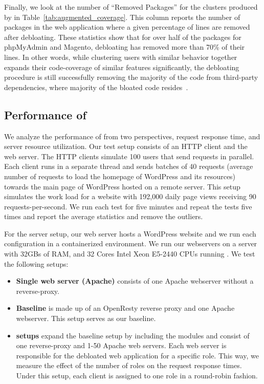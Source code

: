 Finally, we look at the number of ``Removed Packages'' for the clusters produced by \sys{} in Table~\ref{tab:augmented_coverage}. 
This column reports the number of packages in the web application where a given percentage of lines are removed after debloating.
These statistics show that for over half of the packages for phpMyAdmin and Magento, debloating has removed more than 70\% of their lines. 
In other words, while clustering users with similar behavior together expands their code-coverage of similar features significantly, the debloating procedure is still successfully removing the majority of the code from third-party dependencies, where majority of the bloated code resides~\cite{lessismore}.

\subsection{Performance of \sys}

We analyze the performance of \sys{} from two perspectives, request response time, and server resource utilization. 
Our test setup consists of an HTTP client and the web server. 
The HTTP clients simulate 100 users that send requests in parallel. 
Each client runs in a separate thread and sends batches of 40 requests (average number of requests to load the homepage of WordPress and its resources) towards the main page of WordPress hosted on a remote server. 
This setup simulates the work load for a website with 192,000 daily page views receiving 90 requests-per-second. 
We run each test for five minutes and repeat the tests five times and report the average statistics and remove the outliers. 

For the server setup, our web server hosts a WordPress website and we run each configuration in a containerized environment. 
We run our webservers on a server with 32GBs of RAM, and 32 Cores Intel Xeon E5-2440 CPUs running . 
We test the following setups:

\begin{itemize}
    \item \textbf{Single web server (Apache)} consists of one Apache webserver without a reverse-proxy. 
    \item \textbf{Baseline} is made up of an OpenResty reverse proxy and one Apache webserver. This setup serves as our baseline. 
    \item \textbf{\sys{} setups} expand the baseline setup by including the \sys{} modules and consist of one reverse-proxy and 1-50 Apache web servers. Each web server is responsible for the debloated web application for a specific role. This way, we measure the effect of the number of roles on the request response times. Under this setup, each client is assigned to one role in a round-robin fashion.
\end{itemize}

